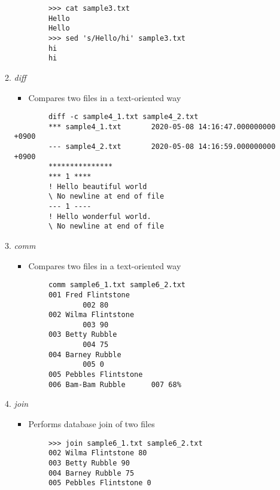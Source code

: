 \documentclass[12pt]{article}
\begin{document}
\begin{itemize}
\begin{enumerate}[1.]
        \bigskip

        \begin{lstlisting}
        >>> cat sample3.txt
        Hello
        Hello
        >>> sed 's/Hello/hi' sample3.txt
        hi
        hi
        \end{lstlisting}

        \item \textit{diff}
        \begin{itemize}
            \item Compares two files in a text-oriented way
        \end{itemize}

        \begin{lstlisting}
        diff -c sample4_1.txt sample4_2.txt
        *** sample4_1.txt       2020-05-08 14:16:47.000000000 +0900
        --- sample4_2.txt       2020-05-08 14:16:59.000000000 +0900
        ***************
        *** 1 ****
        ! Hello beautiful world
        \ No newline at end of file
        --- 1 ----
        ! Hello wonderful world.
        \ No newline at end of file
        \end{lstlisting}

        \item \textit{comm}
        \begin{itemize}
            \item Compares two files in a text-oriented way
        \end{itemize}

        \begin{lstlisting}
        comm sample6_1.txt sample6_2.txt
        001 Fred Flintstone
                002 80
        002 Wilma Flintstone
                003 90
        003 Betty Rubble
                004 75
        004 Barney Rubble
                005 0
        005 Pebbles Flintstone
        006 Bam-Bam Rubble      007 68%
        \end{lstlisting}


        \item \textit{join}
        \begin{itemize}
            \item Performs database join of two files

        \end{itemize}

        \begin{lstlisting}
        >>> join sample6_1.txt sample6_2.txt
        002 Wilma Flintstone 80
        003 Betty Rubble 90
        004 Barney Rubble 75
        005 Pebbles Flintstone 0
        \end{lstlisting}

    \end{enumerate}
\end{itemize}
\end{document}
